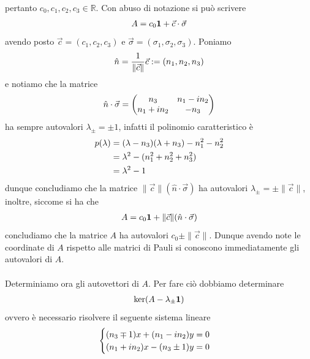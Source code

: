 \documentclass{article}
\begin{document}
pertanto $c_0, c_1, c_2, c_3 \in \mathbb{R}$. Con abuso di notazione si può scrivere
\begin{gather}
    A = c_0 \mathbf{1} + \vec{c} \cdot \vec{\sigma} \notag
\end{gather}
avendo posto $\vec{c} = (c_1, c_2, c_3)$ e $\vec{\sigma} = (\sigma_1, \sigma_2, \sigma_3)$. Poniamo
\begin{gather}
    \hat{n} = \frac{1}{\| \vec{c} \|}\vec{c} := (n_1, n_2, n_3) \notag
\end{gather}
e notiamo che la matrice
\begin{gather}
    \hat{n} \cdot \vec{\sigma} = \begin{pmatrix}
        n_3 & n_1 - in_2 \\
        n_1 + in_2 & -n_3
    \end{pmatrix} \notag
\end{gather}
ha sempre autovalori $\lambda_{\pm} = \pm 1$, infatti il polinomio caratteristico è
\begin{align}
    p(\lambda) &= (\lambda - n_3)(\lambda + n_3) - n_1^2 - n_2^2 \notag \\
    &= \lambda^2 - (n_1^2 + n_2^2 + n_3^2) \notag \\
    &= \lambda^2 - 1 \notag
\end{align}
dunque concludiamo che la matrice $\| \vec{c} \|(\hat{n} \cdot \vec{\sigma})$ ha autovalori $\lambda_{\pm} = \pm \| \vec{c} \|$, inoltre, siccome si ha che
\begin{gather}
    A = c_0 \mathbf{1} + \| \vec{c} \|(\hat{n} \cdot \vec{\sigma}) \notag
\end{gather}
concludiamo che la matrice $A$ ha autovalori $c_0 \pm \| \vec{c} \|$. Dunque avendo note le coordinate di $A$ rispetto alle matrici di Pauli si conoscono immediatamente gli autovalori di $A$. \\ \\
Determiniamo ora gli autovettori di $A$. Per fare ciò dobbiamo determinare
\begin{gather}
    \ker (A - \lambda_{\pm}\mathbf{1}) \notag
\end{gather}
ovvero è necessario risolvere il seguente sistema lineare
\begin{gather}
    \begin{cases}
        (n_3 \mp 1)x + (n_1 - in_2)y = 0 \notag \\
        (n_1 + in_2)x - (n_3 \pm 1)y = 0 \notag
    \end{cases}
\end{gather}
\end{document}
